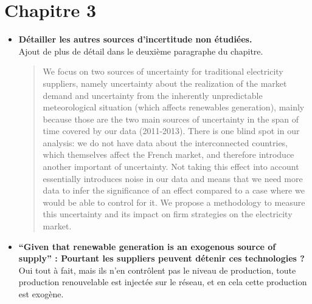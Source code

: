 \documentclass{article}
\begin{document}
\section{Chapitre 3}
\begin{itemize}
\item \textbf{Détailler les autres sources d'incertitude non étudiées.}\\

Ajout de plus de détail dans le deuxième paragraphe du chapitre.

\begin{quote}
We focus on two sources of uncertainty for traditional electricity suppliers, namely uncertainty about the realization of the market demand and uncertainty from the inherently unpredictable meteorological situation
(which affects renewables generation), mainly because those are the two main sources of uncertainty in the span of time covered by our data (2011-2013). There is one blind spot in our analysis: we do not have data about the interconnected countries, which themselves affect the French market, and therefore introduce another important of uncertainty. Not taking this effect into account essentially introduces noise in our data and means that we need more data to infer the significance of an effect compared to a case where we would be able to control for it. We propose a methodology to measure this uncertainty and its impact on firm strategies on the electricity market. 
\end{quote}

\item \textbf{``Given that renewable generation is an exogenous source of supply'' :
Pourtant les suppliers peuvent détenir ces technologies ?}\\

Oui tout à fait, mais ils n'en contrôlent pas le niveau de production, toute production renouvelable est injectée sur le réseau, et en cela cette production est exogène. 
\end{itemize}
\end{document}
